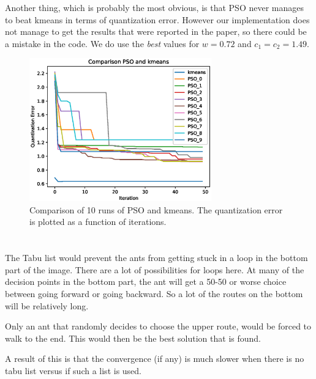 \documentclass[11pt]{article}
\begin{document}
Another thing, which is probably the most obvious, is that PSO never manages to beat kmeans in terms of quantization error. However our implementation does not manage to get the results that were reported in the paper, so there could be a mistake in the code. We do use the \textit{best} values for $w = 0.72$ and $c_1 = c_2 = 1.49$.

\begin{figure}[H]
	\centering
	\includegraphics[width=0.7\textwidth]{images/pso_kmeans.eps}
	\caption{Comparison of 10 runs of PSO and kmeans. The quantization error is plotted as a function of iterations.}
	\label{fig:pso_kmeans}
\end{figure}

\section{}

The Tabu list  would prevent the ants from getting stuck in a loop in the bottom part of the image. There are a lot of possibilities for loops here. At many of the decision points in the bottom part, the ant will get a 50-50 or worse choice between going forward or going backward. So a lot of the routes on the bottom will be relatively long.

Only an ant that randomly decides to choose the upper route, would be forced to walk to the end. This would then be the best solution that is found. 

A result of this is that the convergence (if any) is much slower when there is no tabu list versus if such a list is used.

\section{}
\end{document}
